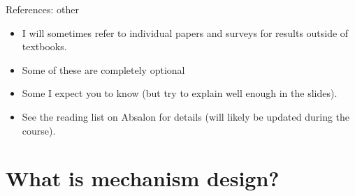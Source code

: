 \documentclass[english,10pt
,aspectratio=169
]{beamer}
\begin{document}
\begin{frame}{References: other}
	\begin{itemize}
		\item I will sometimes refer to individual papers and surveys for results outside of textbooks.
		\item Some of these are completely optional 
		\item Some I expect you to know (but try to explain well enough in the slides).
		\item See the reading list on Absalon for details (will likely be updated during the course).
	\end{itemize}
\end{frame}







\section{What is mechanism design?}
\end{document}
